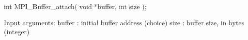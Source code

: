 int MPI_Buffer_attach( void *buffer, int size );

Input arguments:
buffer : initial buffer address (choice)
size : buffer size, in bytes (integer)
